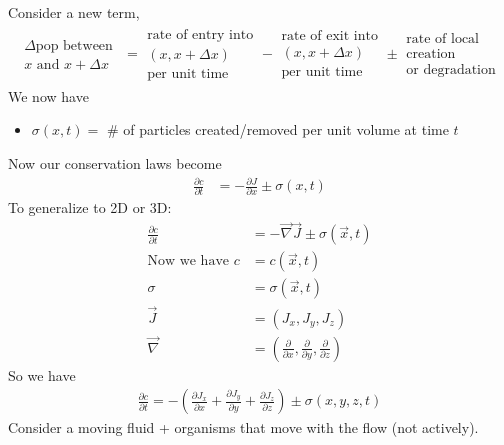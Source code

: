 \documentclass[12pt, letterpaper]{article}
\begin{document}
Consider a new term,
\begin{align*}
    \begin{matrix}
    \Delta \text{pop between } \\ x \text{ and } x + \Delta x
    \end{matrix} = 
    \begin{matrix}
        \text{rate of entry into} \\ (x,x+\Delta x) \\ \text{per unit time}
    \end{matrix} - 
    \begin{matrix}
        \text{rate of exit into} \\ (x,x+\Delta x) \\ \text{per unit time}
    \end{matrix}
    \pm \begin{matrix}
        \text{rate of local} \\ \text{creation} \\ \text{or degradation}
    \end{matrix}
\end{align*}
We now have
\begin{itemize}
    \item $\sigma(x,t) = $ \# of particles created/removed per unit volume at time $t$   
\end{itemize}
Now our conservation laws become
\begin{align*}
    \frac{\partial c}{\partial t} &= -\frac{\partial J}{\partial x} \pm \sigma(x,t)
\end{align*}
To generalize to 2D or 3D:
\begin{align*}
    \frac{\partial c}{\partial t} &= -\vec{\nabla} \vec{J} \pm \sigma(\vec x, t) \\
    \text{Now we have } c &= c(\vec{x}, t) \\
    \sigma &= \sigma(\vec{x}, t) \\
    \vec{J} &= (J_x, J_y, J_z) \\
    \vec{\nabla} &= (\frac{\partial}{\partial x}, \frac{\partial}{\partial y}, \frac{\partial}{\partial z})
\end{align*}
So we have 
\begin{align*}
    \frac{\partial c}{\partial t} = - (\frac{\partial J_x}{\partial x} + \frac{\partial J_y}{\partial y} + \frac{\partial J_z}{\partial z}) \pm \sigma (x,y,z,t)
\end{align*}
 Consider a moving fluid + organisms that move with the flow (not actively). 
\end{document}
